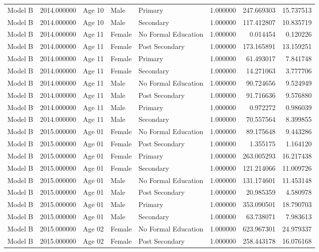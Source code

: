\begin{table}[ht]
\begin{tabular}{lrlllrrr}
Model B & 2014.000000 & Age 10 & Male & Primary & 1.000000 & 247.669303 & 15.737513 \\
Model B & 2014.000000 & Age 10 & Male & Secondary & 1.000000 & 117.412807 & 10.835719 \\
Model B & 2014.000000 & Age 11 & Female & No Formal Education & 1.000000 & 0.014454 & 0.120226 \\
Model B & 2014.000000 & Age 11 & Female & Post Secondary & 1.000000 & 173.165891 & 13.159251 \\
Model B & 2014.000000 & Age 11 & Female & Primary & 1.000000 & 61.493017 & 7.841748 \\
Model B & 2014.000000 & Age 11 & Female & Secondary & 1.000000 & 14.271063 & 3.777706 \\
Model B & 2014.000000 & Age 11 & Male & No Formal Education & 1.000000 & 90.724656 & 9.524949 \\
Model B & 2014.000000 & Age 11 & Male & Post Secondary & 1.000000 & 91.716636 & 9.576880 \\
Model B & 2014.000000 & Age 11 & Male & Primary & 1.000000 & 0.972272 & 0.986039 \\
Model B & 2014.000000 & Age 11 & Male & Secondary & 1.000000 & 70.557564 & 8.399855 \\
Model B & 2015.000000 & Age 01 & Female & No Formal Education & 1.000000 & 89.175648 & 9.443286 \\
Model B & 2015.000000 & Age 01 & Female & Post Secondary & 1.000000 & 1.355175 & 1.164120 \\
Model B & 2015.000000 & Age 01 & Female & Primary & 1.000000 & 263.005293 & 16.217438 \\
Model B & 2015.000000 & Age 01 & Female & Secondary & 1.000000 & 121.214066 & 11.009726 \\
Model B & 2015.000000 & Age 01 & Male & No Formal Education & 1.000000 & 131.174601 & 11.453148 \\
Model B & 2015.000000 & Age 01 & Male & Post Secondary & 1.000000 & 20.985359 & 4.580978 \\
Model B & 2015.000000 & Age 01 & Male & Primary & 1.000000 & 353.090501 & 18.790703 \\
Model B & 2015.000000 & Age 01 & Male & Secondary & 1.000000 & 63.738071 & 7.983613 \\
Model B & 2015.000000 & Age 02 & Female & No Formal Education & 1.000000 & 623.967301 & 24.979337 \\
Model B & 2015.000000 & Age 02 & Female & Post Secondary & 1.000000 & 258.443178 & 16.076168 \\

\end{tabular}
\end{table}
